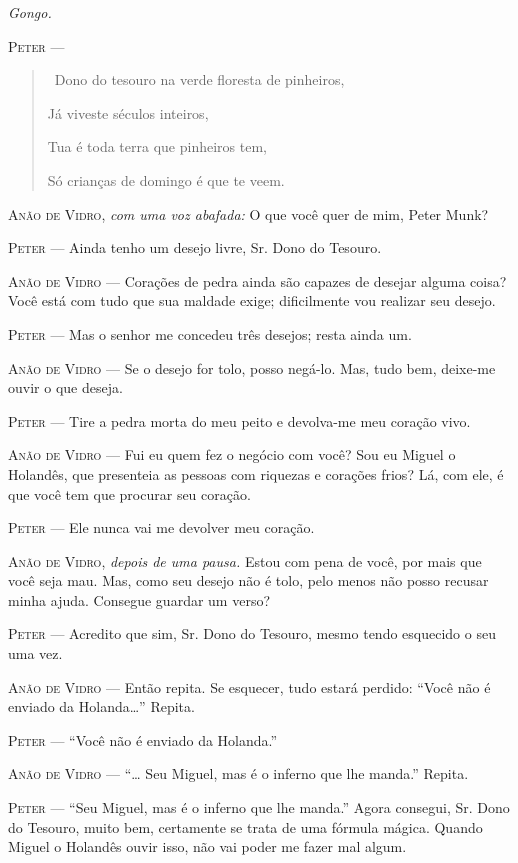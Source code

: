 \emph{Gongo.}

\textsc{Peter} ---

\begin{quote}
\quad \, Dono do tesouro na verde floresta de pinheiros,

Já viveste séculos inteiros,

Tua é toda terra que pinheiros tem,

Só crianças de domingo é que te veem.
\end{quote}

\textsc{Anão de Vidro}, \emph{com uma voz abafada:} O que você quer de mim, Peter
Munk?

\textsc{Peter} --- Ainda tenho um desejo livre, Sr. Dono do Tesouro.

\textsc{Anão de Vidro} --- Corações de pedra ainda são capazes de desejar alguma
coisa? Você está com tudo que sua maldade exige; dificilmente vou
realizar seu desejo.

\textsc{Peter} --- Mas o senhor me concedeu três desejos; resta ainda um.

\textsc{Anão de Vidro} --- Se o desejo for tolo, posso negá-lo. Mas, tudo bem,
deixe-me ouvir o que deseja.

\textsc{Peter} --- Tire a pedra morta do meu peito e devolva-me meu coração vivo.

\textsc{Anão de Vidro} --- Fui eu quem fez o negócio com você? Sou eu Miguel o
Holandês, que presenteia as pessoas com riquezas e corações frios? Lá,
com ele, é que você tem que procurar seu coração.

\textsc{Peter} --- Ele nunca vai me devolver meu coração.

\textsc{Anão de Vidro}, \emph{depois de uma pausa.} Estou com pena de você, por
mais que você seja mau. Mas, como seu desejo não é tolo, pelo menos não
posso recusar minha ajuda. Consegue guardar um verso?

\textsc{Peter} --- Acredito que sim, Sr. Dono do Tesouro, mesmo tendo esquecido o
seu uma vez.

\textsc{Anão de Vidro} --- Então repita. Se esquecer, tudo estará perdido: ``Você
não é enviado da Holanda\ldots{}'' Repita.

\textsc{Peter} --- ``Você não é enviado da Holanda.''

\textsc{Anão de Vidro} --- ``\ldots{} Seu Miguel, mas é o inferno que lhe manda.''
Repita.

\textsc{Peter} --- ``Seu Miguel, mas é o inferno que lhe manda.'' Agora consegui,
Sr. Dono do Tesouro, muito bem, certamente se trata de uma fórmula
mágica. Quando Miguel o Holandês ouvir isso, não vai poder me fazer mal
algum.

